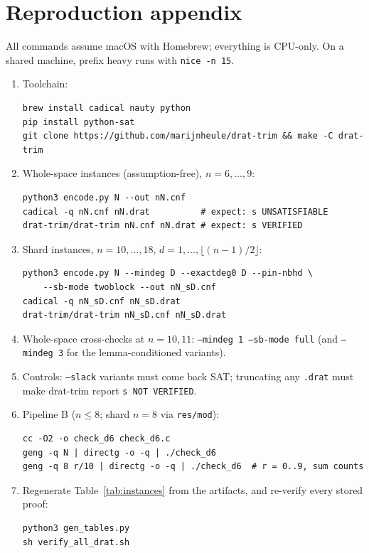 \documentclass[11pt]{article}
\begin{document}
\section*{Reproduction appendix}

All commands assume macOS with Homebrew; everything is CPU-only. On a
shared machine, prefix heavy runs with \texttt{nice -n 15}.

\begin{enumerate}
\item Toolchain:
\begin{verbatim}
brew install cadical nauty python
pip install python-sat
git clone https://github.com/marijnheule/drat-trim && make -C drat-trim
\end{verbatim}
\item Whole-space instances (assumption-free), $n = 6, \dots, 9$:
\begin{verbatim}
python3 encode.py N --out nN.cnf
cadical -q nN.cnf nN.drat          # expect: s UNSATISFIABLE
drat-trim/drat-trim nN.cnf nN.drat # expect: s VERIFIED
\end{verbatim}
\item Shard instances, $n = 10, \dots, 18$, $d = 1, \dots,
\lfloor (n-1)/2 \rfloor$:
\begin{verbatim}
python3 encode.py N --mindeg D --exactdeg0 D --pin-nbhd \
    --sb-mode twoblock --out nN_sD.cnf
cadical -q nN_sD.cnf nN_sD.drat
drat-trim/drat-trim nN_sD.cnf nN_sD.drat
\end{verbatim}
\item Whole-space cross-checks at $n = 10, 11$:
\texttt{--mindeg 1 --sb-mode full} (and \texttt{--mindeg 3} for the
lemma-conditioned variants).
\item Controls: \texttt{--slack} variants must come back SAT; truncating
any \texttt{.drat} must make drat-trim report \texttt{s NOT VERIFIED}.
\item Pipeline B ($n \le 8$; shard $n = 8$ via \texttt{res/mod}):
\begin{verbatim}
cc -O2 -o check_d6 check_d6.c
geng -q N | directg -o -q | ./check_d6
geng -q 8 r/10 | directg -o -q | ./check_d6  # r = 0..9, sum counts
\end{verbatim}
\item Regenerate Table~\ref{tab:instances} from the artifacts, and
re-verify every stored proof:
\begin{verbatim}
python3 gen_tables.py
sh verify_all_drat.sh
\end{verbatim}
\end{enumerate}
\end{document}
